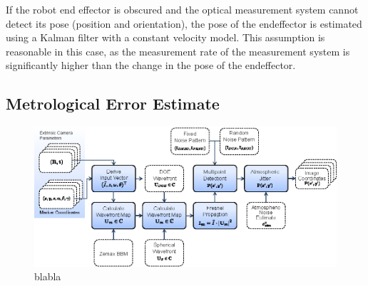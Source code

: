 \documentclass[5p,times,procedia]{elsarticle}
\begin{document}
If the robot end effector is obscured and the optical measurement system cannot detect its pose (position and orientation), the pose of the endeffector is estimated using a Kalman filter with a constant velocity model. This assumption is reasonable in this case, as the measurement rate of the measurement system is significantly higher than the change in the pose of the endeffector.

\subsection{Metrological Error Estimate}
\label{error_estimate}

\cite{Di_Leo_2011}
\cite{Liu_2021}

\begin{figure}[h]
	\centering
	\includegraphics[width=\columnwidth]{graphics/OpticalSimulation.eps}
	\caption{blabla}
\end{figure}
\end{document}
